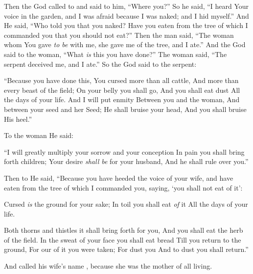 \bverse Then the \lord God called to \Adam and said to him, ``Where \are you?''
\bverse So he said, ``I heard Your voice in the garden, and I was afraid because I was naked; and I hid myself.''
\bverse And He said, ``Who told you that you \were naked? Have you eaten from the tree of which I commanded you that you should not eat?''
\bverse Then the man said, ``The woman whom You gave \textit{to be} with me, she gave me of the tree, and I ate.''
\bverse And the \lord God said to the woman, ``What \textit{is} this you have done?'' The woman said, ``The serpent deceived me, and I ate.''
\bverse So the \lord God said to the serpent: 
\begin{bquotation}
``Because you have done this, You \are cursed more than all cattle, And more than every beast of the field; On your belly you shall go, And you shall eat dust All the days of your life.
\bverse And I will put enmity Between you and the woman, And between your seed and her Seed; He shall bruise your head, And you shall bruise His heel.''
\end{bquotation}
\bverse To the woman He said: 
\begin{bquotation}
``I will greatly multiply your sorrow and your conception In pain you shall bring forth children; Your desire \textit{shall be} for your husband, And he shall rule over you.''
\end{bquotation}
\bverse Then to \Adam He said, ``Because you have heeded the voice of your wife, and have eaten from the tree of which I commanded you, saying, `you shall not eat of it':
\begin{bquotation}
Cursed \textit{is} the ground for your sake; In toil you shall eat \textit{of} it All the days of your life.

\bverse Both thorns and thistles it shall bring forth for you, And you shall eat the herb of the field.
\bverse In the sweat of your face you shall eat bread Till you return to the ground, For our of it you were taken; For dust you \are And to dust you shall return.''
\end{bquotation}
\bverse And \Adam called his wife's name , because she was the mother of all living.

